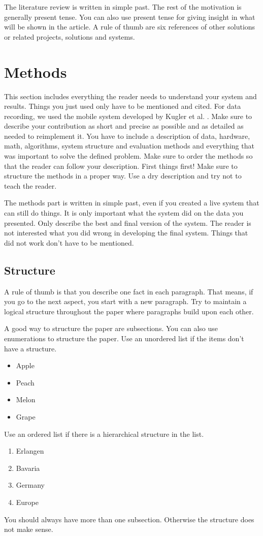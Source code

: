 \documentclass[conference]{IEEEtran}
\begin{document}
The literature review is written in simple past. The rest of the motivation is generally present tense. You can also use present tense for giving insight in what will be shown in the article. A rule of thumb are six references of other solutions or related projects, solutions and systems.  

\section{Methods}
This section includes everything the reader needs to understand your system and results. Things you just used only have to be mentioned and cited. For data recording, we used the mobile system developed by Kugler et al. \cite{ProceedingsArticle}. Make sure to describe your contribution as short and precise as possible and as detailed as needed to reimplement it. You have to include a description of data, hardware, math, algorithms, system structure and evaluation methods and everything that was important to solve the defined problem. Make sure to order the methods so that the reader can follow your description. First things first! Make sure to structure the methods in a proper way. Use a dry description and try not to teach the reader. 

The methods part is written in simple past, even if you created a live system that can still do things. It is only important what the system did on the data you presented. Only describe the best and final version of the system. The reader is not interested what you did wrong in developing the final system. Things that did not work don't have to be mentioned.

\subsection{Structure}
A rule of thumb is that you describe one fact in each paragraph. That means, if you go to the next aspect, you start with a new paragraph. Try to maintain a logical structure throughout the paper where paragraphs build upon each other.

A good way to structure the paper are subsections. You can also use enumerations to structure the paper. Use an unordered list if the items don't have a structure.
\begin{itemize}
\item Apple
\item Peach
\item Melon
\item Grape
\end{itemize}
Use an ordered list if there is a hierarchical structure in the list.
\begin{enumerate}
\item Erlangen
\item Bavaria
\item Germany
\item Europe
\end{enumerate}
You should always have more than one subsection. Otherwise the structure does not make sense.
\end{document}
